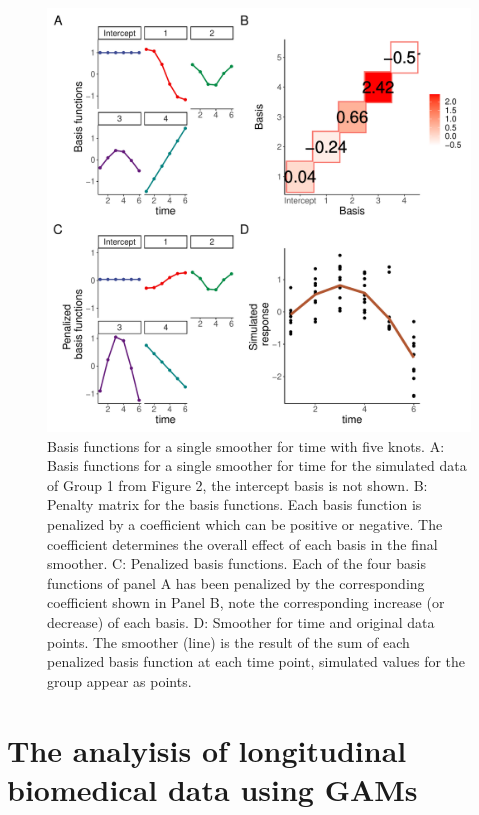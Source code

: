 \documentclass[
]{article}
\begin{document}
\begin{figure}[!h]

{\centering \includegraphics[width=0.75\linewidth,]{Manuscript_AM_v5_files/figure-latex/basis-plot-1} 

}

\caption{Basis functions for a single smoother for time with five knots. A: Basis functions for a single smoother for time for the simulated data of Group 1 from Figure 2, the intercept basis is not shown. B: Penalty matrix for the basis functions. Each basis function is penalized by a coefficient which can be positive or negative. The coefficient determines the overall effect of each basis in the final smoother. C: Penalized basis functions. Each of the four basis functions of panel A has been penalized by the corresponding coefficient shown in Panel B, note the corresponding increase (or decrease) of each basis. D: Smoother for time and original data points. The smoother (line) is the result of the sum of each penalized basis function at each time point, simulated values for the group appear as points.}\label{fig:basis-plot}
\end{figure}

\newpage

\hypertarget{the-analyisis-of-longitudinal-biomedical-data-using-gams}{%
\section{The analyisis of longitudinal biomedical data using GAMs}\label{the-analyisis-of-longitudinal-biomedical-data-using-gams}}
\end{document}

